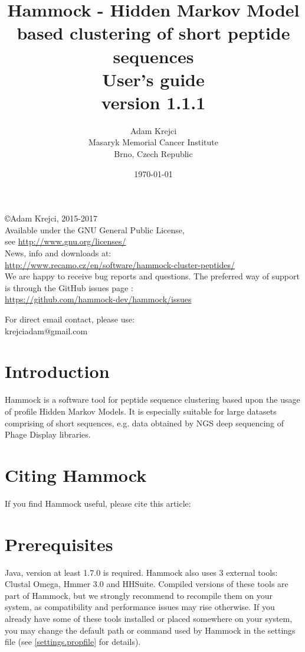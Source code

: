\documentclass[11pt, a4paper, twoside, titlepage]{article}
\title{Hammock - Hidden Markov Model based clustering of short peptide sequences\\ \vspace{2 mm} {\large User's guide} \\ \vspace{2 mm} {\small version 1.1.1}}
\author{Adam Krejci  \\
	Masaryk Memorial Cancer Institute\\
	Brno, Czech Republic
	}
\date{\today}
\begin{document}
\maketitle

\begin{center}
\copyright Adam Krejci, 2015-2017 \\ \vspace{1cm}
Available under the GNU General Public License, \\
see \url{http://www.gnu.org/licenses/} \\ \vspace{1cm}
News, info and downloads at: \\
\url{http://www.recamo.cz/en/software/hammock-cluster-peptides/} \\ \vspace{1cm}
We are happy to receive bug reports and questions. The preferred way of support is through the GitHub issues page : \\
 \url{https://github.com/hammock-dev/hammock/issues}

 For direct email contact, please use: \\
krejciadam@gmail.com
\end{center} 
\newpage



\tableofcontents

\newpage

\section{Introduction}
\label{introduction}
Hammock is a software tool for peptide sequence clustering based upon the usage of profile Hidden Markov Models. It is especially suitable for large datasets comprising of short sequences, e.g. data obtained by NGS deep sequencing of Phage Display libraries.


\section{Citing Hammock}
If you find Hammock useful, please cite this article: \newline




\section{Prerequisites}
\label{prerequisities}
Java, version at least 1.7.0 is required. Hammock also uses 3 external tools: Clustal Omega\cite{Sievers2011}, Hmmer 3.0\citep{Finn2011} and HHSuite\citep{Soding2004}. Compiled versions of these tools are part of Hammock, but we strongly recommend to recompile them on your system, as compatibility and performance issues may rise otherwise. If you already have some of these tools installed or placed somewhere on your system, you may change the default path or command used by Hammock in the settings file (see \ref{settings.propfile} for details). 
\end{document}

